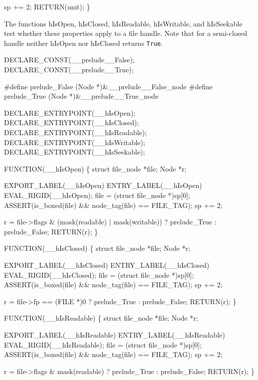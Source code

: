     sp += 2;
    RETURN(unit);
\}

\nwendcode{}\nwdocspar
The functions {\Tt{}hIsOpen\nwendquote}, {\Tt{}hIsClosed\nwendquote}, {\Tt{}hIsReadable\nwendquote},
{\Tt{}hIsWritable\nwendquote}, and {\Tt{}hIsSeekable\nwendquote} test whether these properties
apply to a file handle. Note that for a semi-closed handle neither
{\Tt{}hIsOpen\nwendquote} nor {\Tt{}hIsClosed\nwendquote} returns \texttt{True}.

\nwenddocs{}\plusendmoddef\nwstartdeflinemarkup{}\nwenddeflinemarkup
DECLARE_CONST(__prelude__False);
DECLARE_CONST(__prelude__True);

#define prelude_False (Node *)&__prelude__False_node
#define prelude_True  (Node *)&__prelude__True_node

DECLARE_ENTRYPOINT(__hIsOpen);
DECLARE_ENTRYPOINT(__hIsClosed);
DECLARE_ENTRYPOINT(__hIsReadable);
DECLARE_ENTRYPOINT(__hIsWritable);
DECLARE_ENTRYPOINT(__hIsSeekable);

FUNCTION(__hIsOpen)
\{
    struct file_node *file;
    Node             *r;

    EXPORT_LABEL(__hIsOpen)
 ENTRY_LABEL(__hIsOpen)
    EVAL_RIGID(__hIsOpen);
    file = (struct file_node *)sp[0];
    ASSERT(is_boxed(file) && node_tag(file) == FILE_TAG);
    sp += 2;

    r = file->flags & (mask(readable) | mask(writable))
        ? prelude_True : prelude_False;
    RETURN(r);
\}

FUNCTION(__hIsClosed)
\{
    struct file_node *file;
    Node             *r;

    EXPORT_LABEL(__hIsClosed)
 ENTRY_LABEL(__hIsClosed)
    EVAL_RIGID(__hIsClosed);
    file = (struct file_node *)sp[0];
    ASSERT(is_boxed(file) && node_tag(file) == FILE_TAG);
    sp += 2;

    r = file->fp == (FILE *)0 ? prelude_True : prelude_False;
    RETURN(r);
\}

FUNCTION(__hIsReadable)
\{
    struct file_node *file;
    Node             *r;

    EXPORT_LABEL(__hIsReadable)
 ENTRY_LABEL(__hIsReadable)
    EVAL_RIGID(__hIsReadable);
    file = (struct file_node *)sp[0];
    ASSERT(is_boxed(file) && node_tag(file) == FILE_TAG);
    sp += 2;

    r = file->flags & mask(readable) ? prelude_True : prelude_False;
    RETURN(r);
\}

